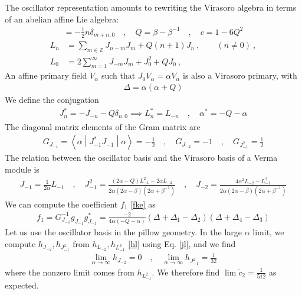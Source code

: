 \documentclass[12pt,a4paper]{article}
\begin{document}
The oscillator representation amounts to rewriting the Virasoro algebra in terms of an abelian affine Lie algebra: 
\begin{align}
 [J_m,J_n] = -\frac12 n\delta_{m+n,0}\quad , \quad Q = \beta -\beta^{-1} \quad , \quad c = 1-6Q^2
\end{align}
\begin{align}
 L_n &= \sum_{m\in{\mathbb{Z}}} J_{n-m}J_m + Q(n+1)J_n\ , \qquad (n\neq 0)\ ,
\label{lnj}
\\
L_0 &=2\sum_{m=1}^\infty J_{-m}J_m +J_0^2+QJ_0 \ ,
\label{lzj}
\end{align}
An affine primary field $V_\alpha$ such that $J_0V_\alpha = \alpha V_\alpha$ is also a Virasoro primary, with 
\begin{align}
 \Delta = \alpha(\alpha + Q)
\end{align}
We define the conjugation 
\begin{align}
 J_n^* = -J_{-n}-Q\delta_{n,0} \implies L_n^* = L_{-n} \quad , \quad \alpha^*=-Q-\alpha
\end{align}
The diagonal matrix elements of the Gram matrix are 
\begin{align}
 G_{J_{-1}} = \left<\alpha\middle|J_{-1}^*J_{-1}\middle|\alpha\right>= -\frac12  \quad , \quad G_{J_{-2}} = -1 \quad ,\quad G_{J_{-1}^2} = \frac12
\end{align}
The relation between the oscillator basis and the Virasoro basis of a Verma module is 
\begin{align}
 J_{-1} = \frac{1}{2\alpha} L_{-1} \quad , \quad J_{-1}^2 = \frac{(2\alpha-Q)L_{-1}^2 -2\alpha L_{-2}}{2\alpha(2\alpha-\beta)(2\alpha+\beta^{-1})} \quad , \quad J_{-2} = \frac{4\alpha^2 L_{-2}-L_{-1}^2}{2\alpha(2\alpha-\beta)(2\alpha+\beta^{-1})}
 \label{jl}
\end{align}
We can compute the coefficient $f_1$ \eqref{fke} as 
\begin{align}
 f_1 = G_{J_{-1}}^{-1} g_{J_{-1}} g_{J_{-1}}^* = \frac{-2}{4\alpha(-Q-\alpha)}(\Delta+\Delta_1-\Delta_2)(\Delta+\Delta_4-\Delta_3)
\end{align}
Let us use the oscillator basis in the pillow geometry. In the large $\alpha$ limit, we compute $h_{J_{-2}},h_{J_{-1}^2}$ from $h_{L_{-2}},h_{L_{-1}^2}$ \eqref{hl} using Eq. \eqref{jl}, and we find 
\begin{align}
 \lim_{\alpha\to \infty} h_{J_{-2}} = 0 \quad , \quad \lim_{\alpha\to \infty} h_{J_{-1}^2} = \frac{1}{32}
 \label{lims}
\end{align}
where the nonzero limit comes from $h_{L_{-1}^2}$. We therefore find $\lim \tilde{c}_2 = \frac{1}{512}$ as expected. 
\end{document}
